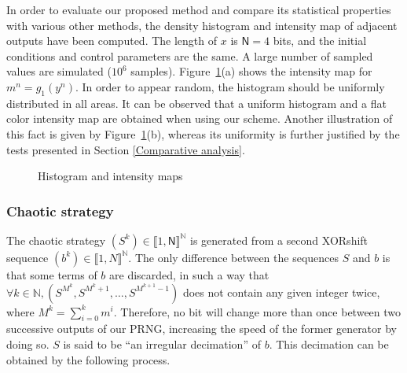 \documentclass[journal]{IEEEtran}
\begin{document}
In order to evaluate our proposed method and compare its statistical properties with various other methods, the density histogram and intensity map of adjacent outputs have been computed. The length of $x$ is $\mathsf{N} = 4$ bits, and the initial conditions and control
parameters are the same. A large number of
sampled values are simulated ($10^6$ samples). 
Figure~\ref{Histogram and intensity map}(a) shows the intensity map for $m^n=g_1(y^n)$.
In order to appear random, the histogram should be uniformly distributed in all areas. 
It can be observed that a uniform histogram and a flat color intensity map are obtained when using our scheme. 
Another illustration of this fact is given by Figure~\ref{Histogram and intensity map}(b), whereas its uniformity is further justified by the tests presented in Section \ref{Comparative analysis}.



\begin{figure}[!t]
\centering
{}

\caption{Histogram and intensity maps}
\label{Histogram and intensity map}
\end{figure}


\subsubsection{Chaotic strategy}
\label{Chaotic strategy}
The chaotic strategy $(S^k) \in \llbracket 1, \mathsf{N} \rrbracket^\mathds{N}$ is generated from a second XORshift sequence $(b^k) \in \llbracket 1, N \rrbracket^\mathds{N}$. The only difference between the sequences $S$ and $b$ is that some terms of $b$ are discarded, in such a way that $\forall k \in \mathds{N}, (S^{M^k}, S^{M^k+1}, \hdots, S^{M^{k+1}-1})$ does not contain any given integer twice, where $M^k = \sum_{i=0}^k m^i$. Therefore, no bit will change more than once between two successive outputs of our PRNG, increasing the speed of the former generator by doing so. $S$ is said to be ``an irregular decimation'' of $b$. This decimation can be obtained by the following process.
\end{document}
